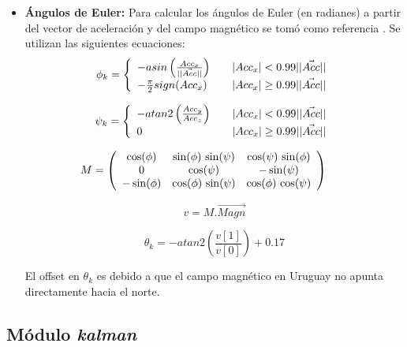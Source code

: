 \documentclass[main]{subfiles}
\begin{document}
\begin{itemize}
\item \textbf{\'Angulos de Euler:} Para calcular los \'angulos de Euler (en radianes) a partir del vector de aceleraci\'on y del campo magn\'etico se tom\'o como referencia \cite{bib:euler_magneto_acc}. Se utilizan las siguientes ecuaciones:
  \[
  \phi_k = \left\{
    \begin{array}{l l}
      -asin\left(\frac{Acc_x}{\vert\vert\vec{Acc}\vert\vert}\right) & \quad \vert Acc_x \vert < 0.99 \vert\vert \vec{Acc} \vert\vert \\
      -\frac{\pi}{2} sign(Acc_x) & \quad   \vert Acc_x \vert \geq 0.99 \vert\vert \vec{Acc} \vert\vert \\
    \end{array} \right.
  \]

  \[
  \psi_k = \left\{
    \begin{array}{l l}
      -atan2\left(\frac{Acc_y}{Acc_z}\right) & \quad \vert Acc_x \vert < 0.99 \vert\vert \vec{Acc} \vert\vert \\
      0 & \quad   \vert Acc_x \vert \geq 0.99 \vert\vert \vec{Acc} \vert\vert \\
    \end{array} \right.
  \]
      
  \[
  \hspace{-20pt}
  M = 
\left(\begin{array}{ccc} \cos\!\left(\mathrm{\phi}\right) & \sin\!\left(\mathrm{\phi}\right)\, \sin\!\left(\mathrm{\psi}\right) & \cos\!\left(\mathrm{\psi}\right)\, \sin\!\left(\mathrm{\phi}\right)\\ 0 & \cos\!\left(\mathrm{\psi}\right) & - \sin\!\left(\mathrm{\psi}\right)\\ - \sin\!\left(\mathrm{\phi}\right) & \cos\!\left(\mathrm{\phi}\right)\, \sin\!\left(\mathrm{\psi}\right) & \cos\!\left(\mathrm{\phi}\right)\, \cos\!\left(\mathrm{\psi}\right) \end{array}\right)
  \]

  \[
  v = M . \vec{Magn}
  \]

  \[
  \theta_k = -atan2\left( \frac{v[1]}{v[0]}\right) + 0.17
  \]

El offset en $\theta_k$ es debido a que el campo magn\'etico en Uruguay no apunta directamente hacia el norte.

\end{itemize}

\subsection{M\'odulo \textit{kalman}}
\label{sec:software:kalman}
\end{document}
